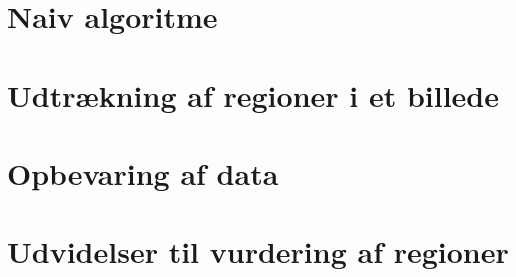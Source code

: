 {\section{Naiv algoritme\label{section_naiv}}


\section{Udtrækning af regioner i et billede\label{section_udtraek}}


\section{Opbevaring af data\label{section_database}}


\section{Udvidelser til vurdering af regioner\label{section_udvidelser}}


}

